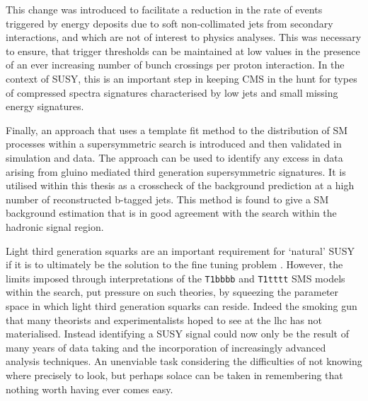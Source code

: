 This change was introduced to facilitate a reduction in the rate of events triggered by energy deposits due to soft non-collimated jets from secondary interactions, and which are not of interest to physics analyses. This was necessary to ensure, that trigger thresholds can be maintained at low values in the presence of an ever increasing number of bunch crossings per proton interaction. In the context of \ac{SUSY}, this is an important step in keeping \ac{CMS} in the hunt for types of compressed spectra signatures characterised by low \et jets and small missing energy signatures.

Finally, an approach that uses a template fit method to the \nbreco distribution of \ac{SM} processes within a supersymmetric search is introduced and then validated in simulation and data. The approach can be used to identify any excess in data arising from gluino mediated third generation supersymmetric signatures. It is utilised within this thesis as a crosscheck of the \alphat background prediction at a high number of reconstructed b-tagged jets. This method is found to give a \ac{SM} background estimation that is in good agreement with the \alphat search within the hadronic signal region.

Light third generation squarks are an important requirement for `natural' \ac{SUSY} if it is to ultimately be the solution to the fine tuning problem \cite{Hardy:2013ywa}. However, the limits imposed through interpretations of the \texttt{T1bbbb} and \texttt{T1tttt} \ac{SMS} models within the \alphat search, put pressure on such theories, by squeezing the parameter space in which light third generation squarks can reside. Indeed the smoking gun that many theorists and experimentalists hoped to see at the \ac{lhc} has not materialised. Instead identifying a \ac{SUSY} signal could now only be the result of many years of data taking and the incorporation of increasingly advanced analysis techniques. An unenviable task considering the difficulties of not knowing where precisely to look, but perhaps solace can be taken in remembering that nothing worth having ever comes easy.

\phantom{}
